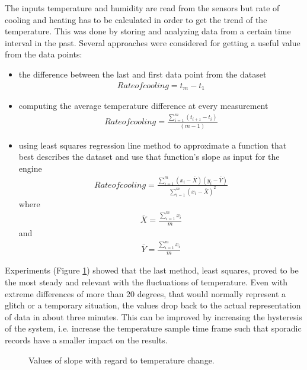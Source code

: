\documentclass[conference]{IEEEtran}
\begin{document}
The inputs temperature and humidity are read from the sensors but rate of cooling and heating has to be
calculated in order to get the trend of the temperature. This was done by storing and analyzing data from
a certain time interval in the past. Several approaches were considered for getting a useful value from the
data points:
\begin{itemize}

\item the difference between the last and first data point from the dataset
\begin{align}
Rate of cooling = t_{m} - t_{1}
\end{align}

\item computing the average temperature difference at every measurement
\begin{align}
Rate of cooling = \frac{\sum_{i=1}^{m}(t_{i + 1} - t_{i})}{(m - 1)}
\end{align}

\item using least squares regression line method to approximate a function that best describes the dataset
and use that function's slope as input for the engine
\begin{align}
Rate of cooling = \frac{\sum_{i=1}^{m}(x_{i} - \overline{X})(y_{i} - \overline{Y})}{\sum_{i=1}^{m}(x_{i} - \overline{X})^2}
\end{align}
where
\begin{align}
\overline{X} = \frac{\sum_{i=1}^{m} x_{i}}{m}
\end{align}
and
\begin{align}
\overline{Y} = \frac{\sum_{i=1}^{m} x_{i}}{m}
\end{align}

\end{itemize}

Experiments (Figure \ref{fig:experiments}) showed that the last method, least squares, proved to be the most
steady and relevant with the fluctuations of temperature.
Even with extreme differences of more than 20 degrees, that would normally represent a glitch or a temporary
situation, the values drop back to the actual representation of data in about three minutes. This can be
improved by increasing the hysteresis of the system, i.e. increase the temperature sample time frame such
that sporadic records have a smaller impact on the results.

\begin{figure}[h!]
\label{fig:nn}
\centerline{}
      \caption[MainModule]{Values of slope with regard to temperature change.}
\label{fig:experiments}
\end{figure}
\end{document}
